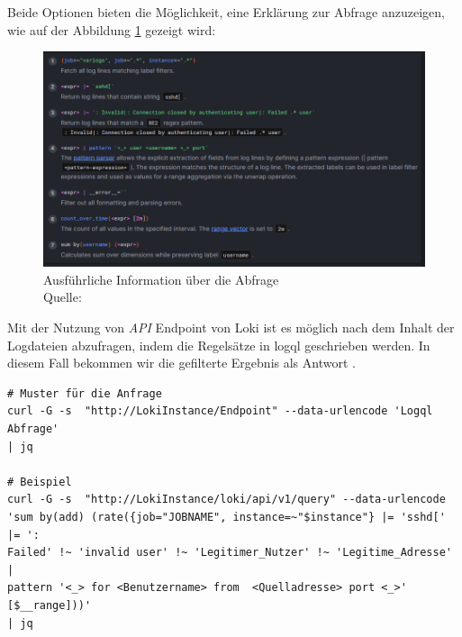 \newpage
Beide Optionen bieten die Möglichkeit, eine Erklärung zur Abfrage anzuzeigen, wie auf der Abbildung \ref{fig:Loki_CodeInformation} gezeigt wird:
\begin{figure}[H]
   \centering
   \includegraphics[width=1\textwidth]{assets/erklaerungLoki.png}
   \caption[Ausführliche Information über die Abfrage]
   {Ausführliche Information über die Abfrage\\Quelle: \citep{Grafana_QueryEditor}}
   \label{fig:Loki_CodeInformation}
   \centering
\end{figure}

Mit der Nutzung von \textit{\gls{API}} \gls{Endpoint} von Loki ist es möglich nach dem Inhalt der Logdateien abzufragen, indem die Regelsätze in \gls{logql} geschrieben werden. In diesem Fall bekommen wir die gefilterte Ergebnis als Antwort \citep{Grafana_api}.

{
\begin{Verbatim}[fontsize=\small, frame=single]
# Muster für die Anfrage
curl -G -s  "http://LokiInstance/Endpoint" --data-urlencode 'Logql Abfrage'
| jq

# Beispiel
curl -G -s  "http://LokiInstance/loki/api/v1/query" --data-urlencode
'sum by(add) (rate({job="JOBNAME", instance=~"$instance"} |= 'sshd[' |= ':
Failed' !~ 'invalid user' !~ 'Legitimer_Nutzer' !~ 'Legitime_Adresse' |
pattern '<_> for <Benutzername> from  <Quelladresse> port <_>' [$__range]))'
| jq
\end{Verbatim}
}

